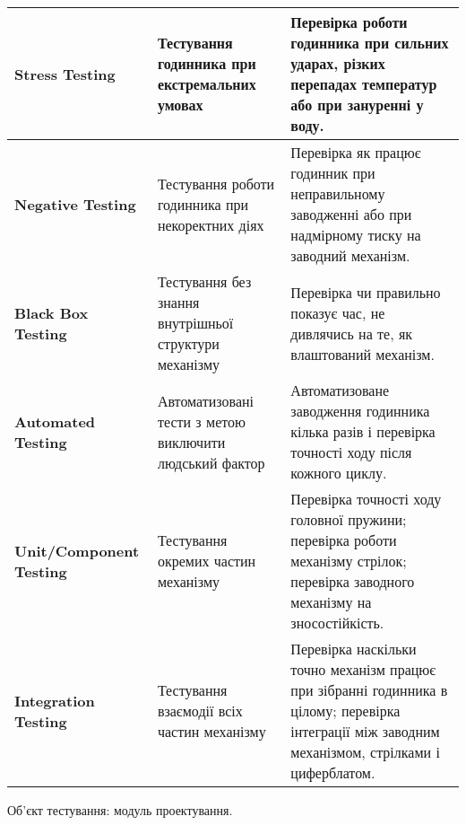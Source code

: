 \documentclass[oneside,14pt]{extarticle}
\begin{document}
\begin{normalsize}
\begin{longtable}{|p{4.5cm}|p{5cm}|p{7cm}|}
		\hline
		\textbf{Stress Testing} & Тестування годинника при екстремальних умовах & Перевірка роботи годинника при сильних ударах, різких перепадах температур або при зануренні у воду. \\
		\hline
		\textbf{Negative Testing} & Тестування роботи годинника при некоректних діях & Перевірка як працює годинник при неправильному заводженні або при надмірному тиску на заводний механізм. \\
		\hline
		\textbf{Black Box Testing} & Тестування без знання внутрішньої структури механізму & Перевірка чи правильно показує час, не дивлячись на те, як влаштований механізм. \\
		\hline
		\textbf{Automated Testing} & Автоматизовані тести з метою виключити людський фактор & Автоматизоване заводження годинника кілька разів і перевірка точності ходу після кожного циклу. \\
		\hline
		\textbf{Unit/Component Testing} & Тестування окремих частин механізму & Перевірка точності ходу головної пружини; перевірка роботи механізму стрілок; перевірка заводного механізму на зносостійкість. \\
		\hline
		\textbf{Integration Testing} & Тестування взаємодії всіх частин механізму & Перевірка наскільки точно механізм працює при зібранні годинника в цілому; перевірка інтеграції між заводним механізмом, стрілками і циферблатом. \\
		\hline
	\end{longtable}
	
	Об'єкт тестування: модуль проектування.
	

\end{normalsize}
\end{document}

